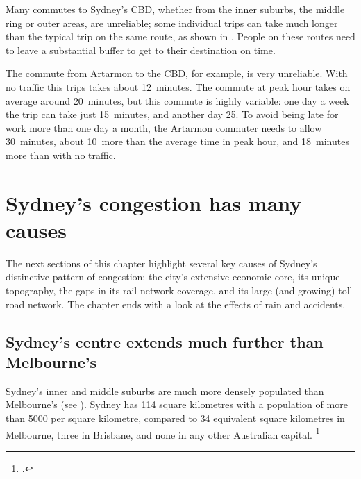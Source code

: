 \documentclass{grattan}
\begin{document}
Many commutes to Sydney's CBD, whether from the inner suburbs, the middle ring or outer areas, are unreliable; some individual trips can take much longer than the typical trip on the same route, as shown in .
People on these routes need to leave a substantial buffer to get to their destination on time.


The commute from Artarmon to the CBD, for example, is very unreliable.
With no traffic this trips takes about 12~minutes. The commute at peak hour takes on average around 20~minutes, but this commute is highly variable: one day a week the trip can take just 15~minutes, and another day 25.
To avoid being late for work more than one day a month, the Artarmon commuter needs to allow 30~minutes, about 10~more than the average time in peak hour, and 18~minutes more than with no traffic.

\section{Sydney's congestion has many causes}

The next sections of this chapter highlight several key causes of Sydney's distinctive pattern of congestion: the city's extensive economic core, its unique topography, the gaps in its rail network coverage, and its large (and growing) toll road network.
The chapter ends with a look at the effects of rain and accidents.

\subsection{Sydney's centre extends much further than Melbourne's}{\label{subsec:jobs-in-sydney-are-dispersed}}
Sydney's inner and middle suburbs are much more densely populated than Melbourne's (see ).
Sydney has 114 square kilometres with a population of more than 5000 per square kilometre, compared to 34 equivalent square kilometres in Melbourne, three in Brisbane, and none in any other Australian capital.%
    \footcite{Urbanist-2015-population-density-is-Sydney-an-outlier}
\end{document}
